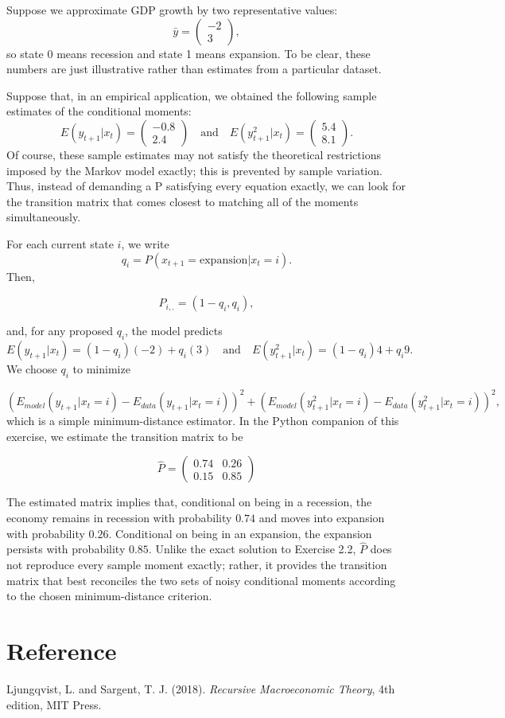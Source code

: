 \documentclass[11pt]{article}
\begin{document}
Suppose we approximate GDP growth by two representative values:
\[
\bar{y} =\begin{pmatrix}
    -2 \\
    3
\end{pmatrix}, 
\]
so state 0 means recession and state 1 means expansion. To be clear, these numbers are just illustrative rather than estimates from a particular dataset.

Suppose that, in an empirical application, we obtained the following sample
estimates of the conditional moments:
\[
E(y_{t+1}|x_t)=\begin{pmatrix}
    -0.8 \\
    2.4
\end{pmatrix} \quad \text{and} \quad E(y_{t+1}^2|x_t)=\begin{pmatrix}
    5.4 \\
    8.1
    \end{pmatrix}.
\]
Of course, these sample estimates may not satisfy the theoretical restrictions imposed by the Markov model exactly; this is prevented by sample variation. Thus, instead of demanding a P satisfying every equation exactly, we can look for the transition matrix that comes closest to matching all of the moments simultaneously.

For each current state \(i\), we write
\[
q_i=P(x_{t+1}= \text{expansion}| x_t =i).
\]
Then, 

\[P_{i,.} = (1-q_i, q_i), \]

and, for any proposed \(q_i\), the model predicts 
\[
E(y_{t+1}|x_t)= (1-q_i)(-2) +q_i(3) \quad \text{and} \quad E(y_{t+1}^2|x_t)=(1-q_i)4+q_i9.
\]
We choose \(q_i\) to minimize 

\[
(E_{model}(y_{t+1}|x_t = i)-E_{data}(y_{t+1}|x_t=i))^2+(E_{model}(y_{t+1}^2|x_t = i)-E_{data}(y_{t+1}^2|x_t=i))^2,
\]
which is a simple minimum-distance estimator. In the Python companion of this exercise, we estimate the transition matrix to be

\[
\hat{P}=\begin{pmatrix}
    0.74 & 0.26 \\
    0.15 & 0.85
\end{pmatrix}
\]

The estimated matrix implies that, conditional on being in a recession, the
economy remains in recession with probability \(0.74\) and moves into expansion
with probability \(0.26\). Conditional on being in an expansion, the expansion
persists with probability \(0.85\). Unlike the exact solution to Exercise 2.2,
\(\hat P\) does not reproduce every sample moment exactly; rather, it provides
the transition matrix that best reconciles the two sets of noisy conditional
moments according to the chosen minimum-distance criterion.

\section*{Reference}

Ljungqvist, L. and Sargent, T. J. (2018).
\textit{Recursive Macroeconomic Theory},
4th edition, MIT Press.
\end{document}
